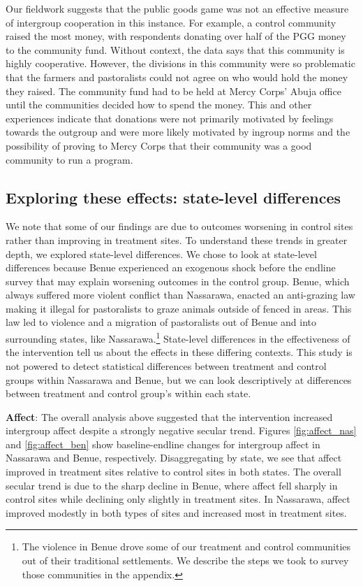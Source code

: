 \documentclass[11pt]{article}
\begin{document}
Our fieldwork suggests that the public goods game was not an effective
measure of intergroup cooperation in this instance. For example, a
control community raised the most money, with respondents donating over
half of the PGG money to the community fund. Without context, the data
says that this community is highly cooperative. However, the divisions
in this community were so problematic that the farmers and pastoralists
could not agree on who would hold the money they raised. The community
fund had to be held at Mercy Corps' Abuja office until the communities
decided how to spend the money. This and other experiences indicate that
donations were not primarily motivated by feelings towards the outgroup
and were more likely motivated by ingroup norms and the possibility of
proving to Mercy Corps that their community was a good community to run
a program.

\hypertarget{exploring-these-effects-state-level-differences}{%
\subsection{Exploring these effects: state-level
differences}\label{exploring-these-effects-state-level-differences}}

We note that some of our findings are due to outcomes worsening in
control sites rather than improving in treatment sites. To understand
these trends in greater depth, we explored state-level differences. We
chose to look at state-level differences because Benue experienced an
exogenous shock before the endline survey that may explain worsening
outcomes in the control group. Benue, which always suffered more violent
conflict than Nassarawa, enacted an anti-grazing law making it illegal
for pastoralists to graze animals outside of fenced in areas. This law
led to violence and a migration of pastoralists out of Benue and into
surrounding states, like Nassarawa.\footnote{The violence in Benue drove
  some of our treatment and control communities out of their traditional
  settlements. We describe the steps we took to survey those communities
  in the appendix.} State-level differences in the effectiveness of the
intervention tell us about the effects in these differing contexts. This
study is not powered to detect statistical differences between treatment
and control groups within Nassarawa and Benue, but we can look
descriptively at differences between treatment and control group's
within each state.

\textbf{Affect}: The overall analysis above suggested that the
intervention increased intergroup affect despite a strongly negative
secular trend. Figures \ref{fig:affect_nas} and \ref{fig:affect_ben}
show baseline-endline changes for intergroup affect in Nassarawa and
Benue, respectively. Disaggregating by state, we see that affect
improved in treatment sites relative to control sites in both states.
The overall secular trend is due to the sharp decline in Benue, where
affect fell sharply in control sites while declining only slightly in
treatment sites. In Nassarawa, affect improved modestly in both types of
sites and increased most in treatment sites.
\end{document}
